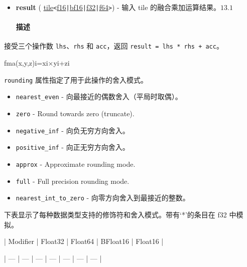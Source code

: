 \documentclass{article}
\begin{document}
\begin{itemize}
\item \textbf{result} ( \href{https://docs.nvidia.com/cuda/tile-ir/latest/sections/types.html#type-tile}{tile}\texttt{<}\href{https://docs.nvidia.com/cuda/tile-ir/latest/sections/types.html#subsection-element-types}{f16}\texttt{|}\href{https://docs.nvidia.com/cuda/tile-ir/latest/sections/types.html#subsection-element-types}{bf16}\texttt{|}\href{https://docs.nvidia.com/cuda/tile-ir/latest/sections/types.html#subsection-element-types}{f32}\texttt{|}\href{https://docs.nvidia.com/cuda/tile-ir/latest/sections/types.html#subsection-element-types}{f64}\texttt{>}) - 输入 tile 的融合乘加运算结果。$\boxed{13.1}$




\paragraph{描述}


\end{itemize}
接受三个操作数 \texttt{lhs}、\texttt{rhs} 和 \texttt{acc}，返回 \texttt{result = lhs * rhs + acc}。



fma(x,y,z)i=xi×yi+zi


\texttt{rounding} 属性指定了用于此操作的舍入模式。



\begin{itemize}
\item \texttt{nearest\_even} - 向最接近的偶数舍入（平局时取偶）。
\item \texttt{zero} - Round towards zero (truncate).

\item \texttt{negative\_inf} - 向负无穷方向舍入。
\item \texttt{positive\_inf} - 向正无穷方向舍入。
\item \texttt{approx} - Approximate rounding mode.

\item \texttt{full} - Full precision rounding mode.

\item \texttt{nearest\_int\_to\_zero} - 向零方向舍入到最接近的整数。


\end{itemize}
下表显示了每种数据类型支持的修饰符和舍入模式。带有`*'的条目在 f32 中模拟。



| Modifier | Float32 | Float64 | BFloat16 | Float16 |


| --- | --- | --- | --- | --- | --- | --- |
\end{document}
